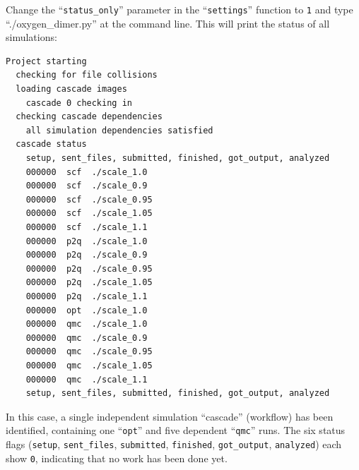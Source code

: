 \documentclass[oneside,11pt]{memoir}
\numberwithin{equation}{section}
\begin{document}
Change the ``\texttt{status\_only}'' parameter in the ``\texttt{settings}'' function to \texttt{1} and type ``./oxygen\_dimer.py'' at the command line.  This will print the status of all simulations:
\begin{shaded}
\begin{verbatim}
Project starting 
  checking for file collisions 
  loading cascade images 
    cascade 0 checking in 
  checking cascade dependencies 
    all simulation dependencies satisfied 
  cascade status 
    setup, sent_files, submitted, finished, got_output, analyzed 
    000000  scf  ./scale_1.0 
    000000  scf  ./scale_0.9 
    000000  scf  ./scale_0.95 
    000000  scf  ./scale_1.05 
    000000  scf  ./scale_1.1 
    000000  p2q  ./scale_1.0 
    000000  p2q  ./scale_0.9 
    000000  p2q  ./scale_0.95 
    000000  p2q  ./scale_1.05 
    000000  p2q  ./scale_1.1 
    000000  opt  ./scale_1.0 
    000000  qmc  ./scale_1.0 
    000000  qmc  ./scale_0.9 
    000000  qmc  ./scale_0.95 
    000000  qmc  ./scale_1.05 
    000000  qmc  ./scale_1.1 
    setup, sent_files, submitted, finished, got_output, analyzed 
\end{verbatim}
\end{shaded}
\noindent
In this case, a single independent simulation ``cascade'' (workflow) has been identified, containing one ``\texttt{opt}'' and five dependent ``\texttt{qmc}'' runs.  The six status flags (\texttt{setup}, \texttt{sent\_files}, \texttt{submitted}, \texttt{finished}, \texttt{got\_output}, \texttt{analyzed}) each show \texttt{0}, indicating that no work has been done yet.  
\end{document}
